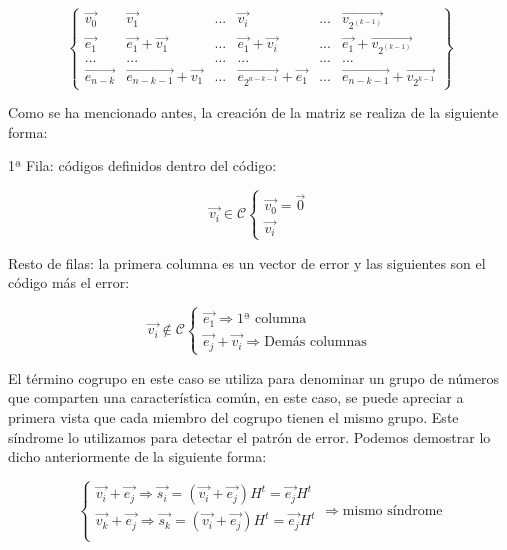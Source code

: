 \documentclass{article}
\begin{document}
\begin{equation}
    \left\{
        \begin{array}{cccccc}
            \vec{v_0} & \vec{v_1} & ... & \vec{v_i} & ... & \vec{v_{2^{(k-1)}}} \\
            \vec{e_1} & \vec{e_1} + \vec{v_1} & ... & \vec{e_1} + \vec{v_i} & ... & \vec{e_1} + \vec{v_{2^{(k-1)}}}  \\
            ... & ... & ... & ... & ... & ... \\
            \vec{e_{n-k}} & \vec{e_{n-k-1}} + \vec{v_1} & ... & \vec{e_{2^{n-k-1}}}+\vec{e_1} & ... & \vec{e_{n-k-1}} + \vec{v_{2^{k-1}}}
        \end{array}
    \right\}
\end{equation}

Como se ha mencionado antes, la creación de la matriz se realiza de la siguiente forma:

1ª Fila: códigos definidos dentro del código:

\begin{equation}
    \vec{v_i} \in \mathcal{C}
    \left\{
        \begin{array}{c}
            \vec{v_0} = \vec{0} \\
            \vec{v_i}
        \end{array}
    \right.
\end{equation}

Resto de filas: la primera columna es un vector de error y las siguientes son el código más el error:

\begin{equation}
    \vec{v_i} \notin \mathcal{C}
    \left\{
        \begin{array}{c}
            \vec{e_1} \Rightarrow \text{1ª columna} \\
            \vec{e_j} + \vec{v_i} \Rightarrow \text{Demás columnas}
        \end{array}
    \right.
\end{equation}

El término cogrupo en este caso se utiliza para denominar un grupo de números que comparten una característica común, en este caso, se puede apreciar a primera vista que cada miembro del cogrupo tienen el mismo grupo. Este síndrome lo utilizamos para detectar el patrón de error. Podemos demostrar lo dicho anteriormente de la siguiente forma:

\begin{equation}
    \left\{
        \begin{array}{c}
            \vec{v_i} + \vec{e_j} \Rightarrow \vec{s_i} = (\vec{v_i} + \vec{e_j})H^t = \vec{e_j}H^t \\
            \vec{v_k} + \vec{e_j} \Rightarrow \vec{s_k} = (\vec{v_i} + \vec{e_j})H^t = \vec{e_j}H^t \\
        \end{array}
        \Rightarrow \text{mismo síndrome}
    \right.
\end{equation}
\end{document}
